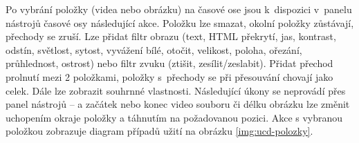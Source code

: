 Po vybrání položky (videa nebo obrázku) na časové ose jsou k~dispozici v~panelu nástrojů časové osy následující akce. Položku lze smazat, okolní položky zůstávají, přechody se zruší. Lze přidat filtr obrazu (text, HTML překrytí, jas, kontrast, odstín, světlost, sytost, vyvážení bílé, otočit, velikost, poloha, ořezání, průhlednost, ostrost) nebo filtr zvuku (ztišit, zesílit/zeslabit). Přidat přechod prolnutí mezi 2 položkami, položky s~přechody se při přesouvání chovají jako celek. Dále lze zobrazit souhrnné vlastnosti. Následující úkony se neprovádí přes panel nástrojů --  a začátek nebo konec video souboru či délku obrázku lze změnit uchopením okraje položky a táhnutím na požadovanou pozici. Akce s vybranou položkou zobrazuje diagram případů užití na obrázku \ref{img:ucd-polozky}.
